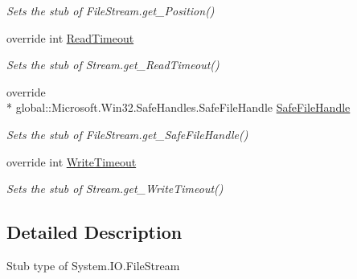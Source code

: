 \begin{DoxyCompactItemize}
\begin{DoxyCompactList}\small\item\em Sets the stub of File\-Stream.\-get\-\_\-\-Position()\end{DoxyCompactList}\item 
override int \hyperlink{class_system_1_1_i_o_1_1_fakes_1_1_stub_file_stream_a2ddebba00acbdc7dcc379db1d4ba7b93}{Read\-Timeout}
\begin{DoxyCompactList}\small\item\em Sets the stub of Stream.\-get\-\_\-\-Read\-Timeout()\end{DoxyCompactList}\item 
override \\*
global\-::\-Microsoft.\-Win32.\-Safe\-Handles.\-Safe\-File\-Handle \hyperlink{class_system_1_1_i_o_1_1_fakes_1_1_stub_file_stream_a8dc434afca10b8fd8af7205baf8b3060}{Safe\-File\-Handle}
\begin{DoxyCompactList}\small\item\em Sets the stub of File\-Stream.\-get\-\_\-\-Safe\-File\-Handle()\end{DoxyCompactList}\item 
override int \hyperlink{class_system_1_1_i_o_1_1_fakes_1_1_stub_file_stream_ae96601dd93627a1937ba06320fc05565}{Write\-Timeout}
\begin{DoxyCompactList}\small\item\em Sets the stub of Stream.\-get\-\_\-\-Write\-Timeout()\end{DoxyCompactList}\end{DoxyCompactItemize}


\subsection{Detailed Description}
Stub type of System.\-I\-O.\-File\-Stream




